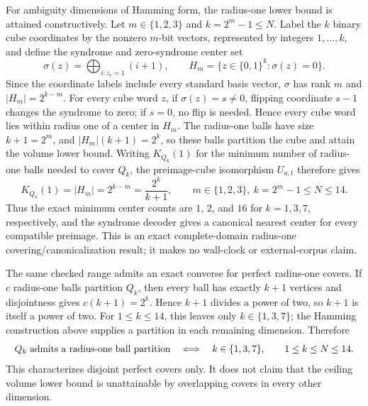 \documentclass{article}
\newcommand{\fitmath}[1]{\resizebox{0.99\linewidth}{!}{$\displaystyle #1$}}
\begin{document}
For ambiguity dimensions of Hamming form, the radius-one lower bound is attained
constructively. Let $m\in\{1,2,3\}$ and $k=2^m-1\leq N$. Label the $k$ binary
cube coordinates by the nonzero $m$-bit vectors, represented by integers
$1,\ldots,k$, and define the syndrome and zero-syndrome center set
\[
  \sigma(z)=\bigoplus_{i:z_i=1}(i+1),
  \qquad
  H_m=\{z\in\{0,1\}^k:\sigma(z)=0\}.
\]
Since the coordinate labels include every standard basis vector, $\sigma$ has
rank $m$ and $|H_m|=2^{k-m}$. For every cube word
$z$, if $\sigma(z)=s\neq0$, flipping coordinate $s-1$ changes the syndrome to
zero; if $s=0$, no flip is needed. Hence every cube word lies within radius one
of a center in $H_m$. The radius-one balls have size $k+1=2^m$, and
$|H_m|(k+1)=2^k$, so these balls partition the cube and attain the volume lower
bound. Writing $K_{Q_k}(1)$ for the minimum number of radius-one balls needed to
cover $Q_k$, the preimage-cube isomorphism $U_{a,t}$ therefore gives
\begin{equation}
  K_{Q_k}(1)=|H_m|=2^{k-m}=\frac{2^k}{k+1},
  \qquad
  m\in\{1,2,3\},\ k=2^m-1\leq N\leq14.
  \label{eq:optimization-crazy-profile-preimage-cube-perfect-radius-one-cover}
\end{equation}
Thus the exact minimum center counts are $1$, $2$, and $16$ for
$k=1,3,7$, respectively, and the syndrome decoder gives a canonical nearest
center for every compatible preimage. This is an exact complete-domain
radius-one covering/canonicalization result; it makes no wall-clock or
external-corpus claim.

The same checked range admits an exact converse for perfect radius-one covers.
If $c$ radius-one balls partition $Q_k$, then every ball has exactly $k+1$
vertices and disjointness gives $c(k+1)=2^k$. Hence $k+1$ divides a power of
two, so $k+1$ is itself a power of two. For $1\leq k\leq14$, this leaves only
$k\in\{1,3,7\}$; the Hamming construction above supplies a partition in each
remaining dimension. Therefore
\begin{equation}
  \fitmath{%
    Q_k\text{ admits a radius-one ball partition}
      \quad\Longleftrightarrow\quad
    k\in\{1,3,7\},
    \qquad 1\leq k\leq N\leq14.
  }
  \label{eq:optimization-crazy-preimage-cube-perfect-radius-one-dimensions}
\end{equation}
This characterizes disjoint perfect covers only. It does not claim that the
ceiling volume lower bound is unattainable by overlapping covers in every other
dimension.
\end{document}
